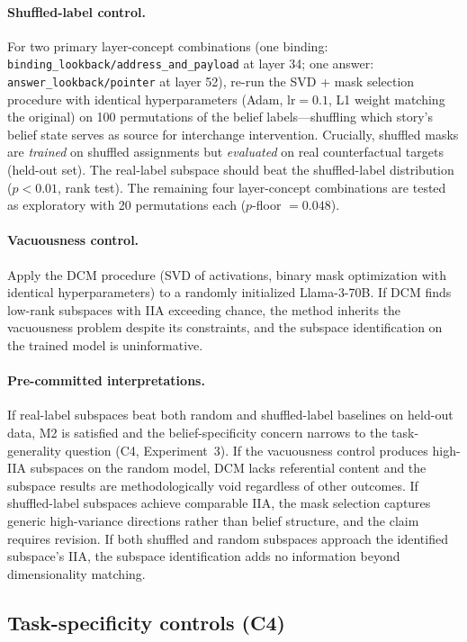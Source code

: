 \documentclass[11pt]{article}
\begin{document}
\paragraph{Shuffled-label control.} For two primary layer-concept combinations (one binding: \texttt{binding\_lookback/address\_and\_payload} at layer 34; one answer: \texttt{answer\_lookback/pointer} at layer 52), re-run the SVD + mask selection procedure with identical hyperparameters (Adam, $\text{lr} = 0.1$, L1 weight matching the original) on 100 permutations of the belief labels---shuffling which story's belief state serves as source for interchange intervention. Crucially, shuffled masks are \emph{trained} on shuffled assignments but \emph{evaluated} on real counterfactual targets (held-out set). The real-label subspace should beat the shuffled-label distribution ($p < 0.01$, rank test). The remaining four layer-concept combinations are tested as exploratory with 20 permutations each ($p$-floor $= 0.048$).

\paragraph{Vacuousness control.} Apply the DCM procedure (SVD of activations, binary mask optimization with identical hyperparameters) to a randomly initialized Llama-3-70B. If DCM finds low-rank subspaces with IIA exceeding chance, the method inherits the \citet{sutter2025vacuous} vacuousness problem despite its constraints, and the subspace identification on the trained model is uninformative.

\paragraph{Pre-committed interpretations.} If real-label subspaces beat both random and shuffled-label baselines on held-out data, M2 is satisfied and the belief-specificity concern narrows to the task-generality question (C4, Experiment~3). If the vacuousness control produces high-IIA subspaces on the random model, DCM lacks referential content and the subspace results are methodologically void regardless of other outcomes. If shuffled-label subspaces achieve comparable IIA, the mask selection captures generic high-variance directions rather than belief structure, and the claim requires revision. If both shuffled and random subspaces approach the identified subspace's IIA, the subspace identification adds no information beyond dimensionality matching.

\subsection{Task-specificity controls (C4)}
\end{document}
